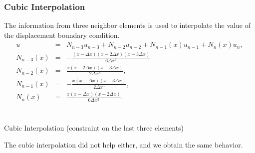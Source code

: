 \documentclass[a4paper,12pt]{article}
\makeatletter
\newenvironment{figurehere}
  {\def\@captype{figure}}
  {}
\makeatother
\begin{document}
\subsubsection{Cubic Interpolation}
The information from three neighbor elements is used to interpolate the value of the displacement boundary condition. 
\begin{eqnarray}
u &=& N_{n-3}u_{n-3}+N_{n-2}u_{n-2}+N_{n-1}(x)u_{n-1}+N_n(x)u_n,\\
N_{n-3}(x) &=& -\frac{(x-\Delta x)(x-2\Delta x)(x-3\Delta x)}{6\Delta x^3}\\
N_{n-2}(x) &=& \frac{x(x-2\Delta x)(x-3\Delta x)}{2\Delta x^3},\\
N_{n-1}(x) &=& -\frac{x(x-\Delta x)(x-3\Delta x)}{2\Delta x^3},\\
N_{n}(x) &=& \frac{x(x-\Delta x)(x-2\Delta x)}{6\Delta x^3}.\\
\end{eqnarray}
\begin{center}
\begin{figurehere} 
\scalebox{0.7}{}\\
\caption{Cubic Interpolation (constraint on the last three elements)}\label{fig:cubic}
\end{figurehere}
\end{center}
The cubic interpolation did not help either, and we obtain the same behavior.
\end{document}
